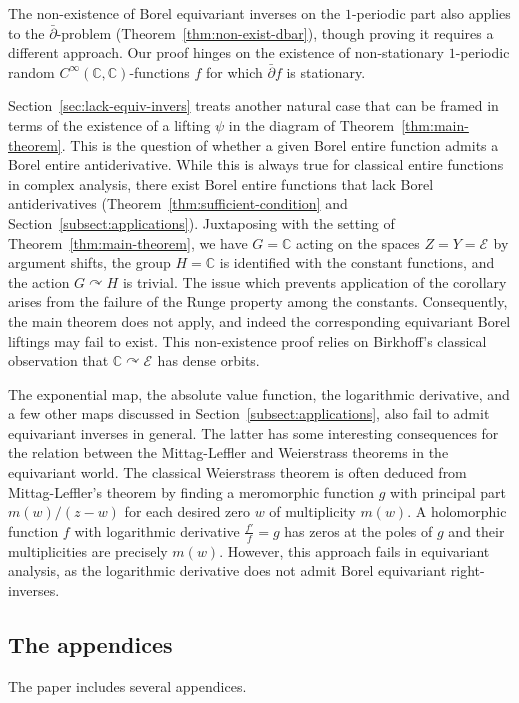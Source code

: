 \documentclass[12pt]{paper}
\numberwithin{equation}{section}
\theoremstyle{plain}
\theoremstyle{definition}
\newcommand{\C}{\mathbb{C}}
\newcommand{\smooth}[2][]{C^{\infty}_{#1}(#2)}
\newcommand{\smoothCC}{\smooth{\C,\C}}
\newcommand{\holom}[1][]{\mathcal{E}_{#1}}
\newcommand{\acts}{\curvearrowright}
\begin{document}
The non-existence of Borel equivariant inverses on the \(1\)-periodic part also applies to the
\(\bar{\partial}\)-problem (Theorem~\ref{thm:non-exist-dbar}), though proving it requires a
different approach.  Our proof hinges on the existence of non-stationary \(1\)-periodic random
\(\smoothCC\)-functions \(f\) for which \(\bar{\partial}f\) is stationary.


Section~\ref{sec:lack-equiv-invers} treats another natural case that can be framed in terms of the
existence of a lifting \(\psi\) in the diagram of Theorem~\ref{thm:main-theorem}.  This is the
question of whether a given Borel entire function admits a Borel entire antiderivative.  While this
is always true for classical entire functions in complex analysis, there exist Borel entire
functions that lack Borel antiderivatives (Theorem~\ref{thm:sufficient-condition} and
Section~\ref{subsect:applications}).  Juxtaposing with the setting of
Theorem~\ref{thm:main-theorem}, we have \(G=\C\) acting on the spaces \(Z = Y = \holom \) by
argument shifts, the group \(H = \C\) is identified with the constant functions, and the action
\(G\acts H\) is trivial. The issue which prevents application of the corollary arises from the
failure of the Runge property among the constants.  Consequently, the main theorem does not apply,
and indeed the corresponding equivariant Borel liftings may fail to exist. This non-existence proof
relies on Birkhoff's classical observation that \(\C\acts \holom\) has dense orbits.

The exponential map, the absolute value function, the logarithmic derivative, and a few other maps
discussed in Section~\ref{subsect:applications}, also fail to admit equivariant inverses in
general. The latter has some interesting consequences for the relation between the Mittag-Leffler
and Weierstrass theorems in the equivariant world. The classical Weierstrass theorem is often
deduced from Mittag-Leffler's theorem by finding a meromorphic function \(g\) with principal part
\(m(w)/(z-w)\) for each desired zero \(w\) of multiplicity \(m(w)\).  A holomorphic function \(f\)
with logarithmic derivative \(\frac{f'}{f} = g\) has zeros at the poles of \(g\) and their
multiplicities are precisely \(m(w)\). However, this approach fails in equivariant analysis, as the
logarithmic derivative does not admit Borel equivariant right-inverses.


\subsection{The appendices}
The paper includes several appendices.
\end{document}
